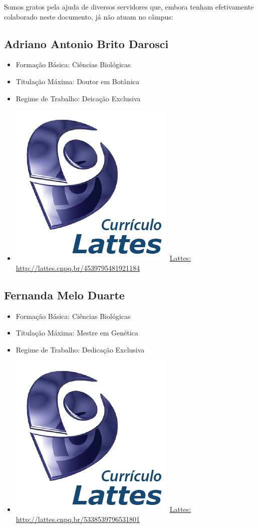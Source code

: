 \documentclass[11pt,fleqn]{book} %
\begin{document}
Somos gratos pela ajuda de diversos servidores que, embora tenham efetivamente colaborado neste documento, já não atuam no câmpus:

\subsection*{Adriano Antonio Brito Darosci}\label{AdrianoDarosci}
\begin{itemize}
	\item Formação Básica: Ciências Biológicas
	\item Titulação Máxima: Doutor em Botânica
	\item Regime de Trabalho: Deicação Exclusiva
	\item \includegraphics[scale=.03]{Pictures/lattes}~\href{http://lattes.cnpq.br/4539795481921184}{Lattes: http://lattes.cnpq.br/4539795481921184}
\end{itemize}

\subsection*{Fernanda Melo Duarte}\label{FernandaDuarte}
\begin{itemize}
	\item Formação Básica: Ciências Biológicas
	\item Titulação Máxima: Mestre em Genética
	\item Regime de Trabalho: Dedicação Exclusiva
	\item \includegraphics[scale=.03]{Pictures/lattes}~\href{http://lattes.cnpq.br/5338539796531801}{Lattes: http://lattes.cnpq.br/5338539796531801}
\end{itemize}
\end{document}
